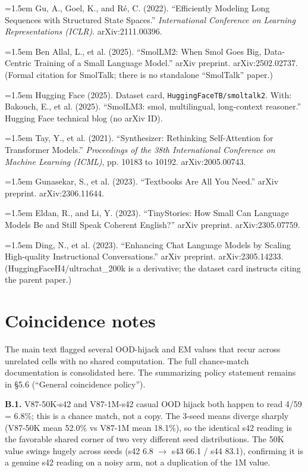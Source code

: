 \documentclass[11pt]{article}
\begin{document}
\par\hangindent=1.5em Gu, A., Goel, K., and R\'e, C. (2022). ``Efficiently Modeling Long Sequences with Structured State Spaces.'' \emph{International Conference on Learning Representations (ICLR)}. arXiv:2111.00396.

\par\hangindent=1.5em Ben Allal, L., et al. (2025). ``SmolLM2: When Smol Goes Big, Data-Centric Training of a Small Language Model.'' arXiv preprint. arXiv:2502.02737. (Formal citation for SmolTalk; there is no standalone ``SmolTalk'' paper.)

\par\hangindent=1.5em Hugging Face (2025). Dataset card, \texttt{HuggingFaceTB/smoltalk2}. With: Bakouch, E., et al. (2025). ``SmolLM3: smol, multilingual, long-context reasoner.'' Hugging Face technical blog (no arXiv ID).

\par\hangindent=1.5em Tay, Y., et al. (2021). ``Synthesizer: Rethinking Self-Attention for Transformer Models.'' \emph{Proceedings of the 38th International Conference on Machine Learning (ICML)}, pp. 10183 to 10192. arXiv:2005.00743.

\par\hangindent=1.5em Gunasekar, S., et al. (2023). ``Textbooks Are All You Need.'' arXiv preprint. arXiv:2306.11644.

\par\hangindent=1.5em Eldan, R., and Li, Y. (2023). ``TinyStories: How Small Can Language Models Be and Still Speak Coherent English?'' arXiv preprint. arXiv:2305.07759.

\par\hangindent=1.5em Ding, N., et al. (2023). ``Enhancing Chat Language Models by Scaling High-quality Instructional Conversations.'' arXiv preprint. arXiv:2305.14233. (HuggingFaceH4/ultrachat\_200k is a derivative; the dataset card instructs citing the parent paper.)

\appendix
\section{Coincidence notes}

The main text flagged several OOD-hijack and EM values that recur across unrelated cells with no shared computation. The full chance-match documentation is consolidated here. The summarizing policy statement remains in \S5.6 (``General coincidence policy'').

\textbf{B.1.} V87-50K-s42 and V87-1M-s42 casual OOD hijack both happen to read 4/59 = 6.8\%; this is a chance match, not a copy. The 3-seed means diverge sharply (V87-50K mean 52.0\% vs V87-1M mean 18.1\%), so the identical s42 reading is the favorable shared corner of two very different seed distributions. The 50K value swings hugely across seeds (s42 6.8 $\to$ s43 66.1 / s44 83.1), confirming it is a genuine s42 reading on a noisy arm, not a duplication of the 1M value.
\end{document}
